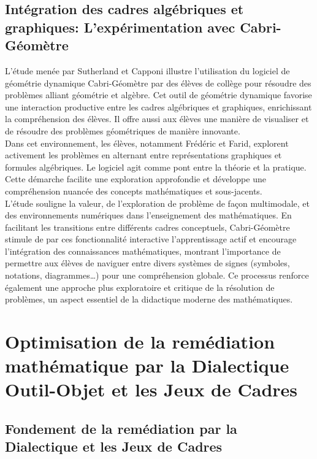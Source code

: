\subsection{Intégration des cadres algébriques et graphiques: L'expérimentation avec Cabri-Géomètre}

L'étude menée par Sutherland et Capponi illustre l'utilisation du logiciel de géométrie dynamique Cabri-Géomètre par des élèves de collège pour résoudre des problèmes alliant géométrie et algèbre.
Cet outil de géométrie dynamique favorise une interaction productive entre les cadres algébriques et graphiques,
enrichissant la compréhension des élèves.
Il offre aussi aux élèves une manière de visualiser et de résoudre des problèmes géométriques de manière innovante.\\

Dans cet environnement,
les élèves,
notamment Frédéric et Farid,
explorent activement les problèmes en alternant entre représentations graphiques et formules algébriques.
Le logiciel agit comme pont entre la théorie et la pratique.
Cette démarche facilite une exploration approfondie et développe une compréhension nuancée des concepts mathématiques et sous-jacents.\\

L'étude souligne la valeur,
de l'exploration de problème de façon multimodale,
et des environnements numériques dans l'enseignement des mathématiques.
En facilitant les transitions entre différents cadres conceptuels,
Cabri-Géomètre stimule de par ces fonctionnalité interactive l'apprentissage actif et encourage l'intégration des connaissances mathématiques,
montrant l'importance de permettre aux élèves de naviguer entre divers systèmes de signes (symboles, notations, diagrammes…) pour une compréhension globale.
Ce processus renforce également une approche plus exploratoire et critique de la résolution de problèmes,
un aspect essentiel de la didactique moderne des mathématiques.

\section{Optimisation de la remédiation mathématique par la Dialectique Outil-Objet et les Jeux de Cadres}

\subsection{Fondement de la remédiation par la Dialectique et les Jeux de Cadres}

